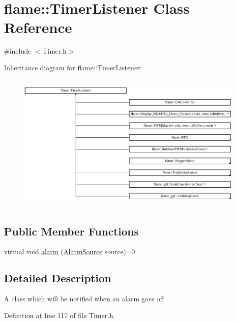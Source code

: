 \hypertarget{classflame_1_1_timer_listener}{\section{flame\-:\-:Timer\-Listener Class Reference}
\label{classflame_1_1_timer_listener}
}


{\ttfamily \#include $<$Timer.\-h$>$}

Inheritance diagram for flame\-:\-:Timer\-Listener\-:\begin{figure}[H]
\begin{center}
\leavevmode
\includegraphics[height=6.879607cm]{classflame_1_1_timer_listener}
\end{center}
\end{figure}
\subsection*{Public Member Functions}
\begin{DoxyCompactItemize}
\item 
virtual void \hyperlink{classflame_1_1_timer_listener_ad97504b72a25b1fba354803338177335}{alarm} (\hyperlink{namespaceflame_a6d176ba245556716fd3e32006bb7cfe5}{Alarm\-Source} source)=0
\end{DoxyCompactItemize}


\subsection{Detailed Description}
A class which will be notified when an alarm goes off 

Definition at line 117 of file Timer.\-h.



